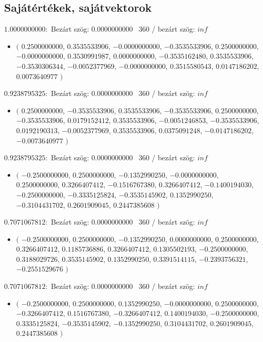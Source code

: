 \documentclass[14pt,a4paper]{article}
\begin{document}
\subsection{Sajátértékek, sajátvektorok}
$1.0000000000$:\
Bezárt szög: $0.0000000000$ \
360 / bezárt szög: $inf$\
\begin{itemize}
\item
$\big($
$0.2500000000$, $0.3535533906$, $-0.0000000000$, $-0.3535533906$, $0.2500000000$, $-0.0000000000$, $0.3530991987$, $0.0000000000$, $-0.3535162480$, $0.3535533906$, $-0.3530306344$, $-0.0052377969$, $-0.0000000000$, $0.3515580543$, $0.0147186202$, $0.0073640977$
$\big)$
\end{itemize}
$0.9238795325$:\
Bezárt szög: $0.0000000000$ \
360 / bezárt szög: $inf$\
\begin{itemize}
\item
$\big($
$0.2500000000$, $-0.3535533906$, $0.3535533906$, $-0.3535533906$, $0.2500000000$, $-0.3535533906$, $0.0179152412$, $0.3535533906$, $-0.0051246853$, $-0.3535533906$, $0.0192190313$, $-0.0052377969$, $0.3535533906$, $0.0375091248$, $-0.0147186202$, $-0.0073640977$
$\big)$
\end{itemize}
$0.9238795325$:\
Bezárt szög: $0.0000000000$ \
360 / bezárt szög: $inf$\
\begin{itemize}
\item
$\big($
$-0.2500000000$, $0.2500000000$, $-0.1352990250$, $-0.0000000000$, $0.2500000000$, $0.3266407412$, $-0.1516767380$, $0.3266407412$, $-0.1400194030$, $-0.2500000000$, $-0.3335125824$, $-0.3535145902$, $0.1352990250$, $-0.3104431702$, $0.2601909045$, $0.2447385608$
$\big)$
\end{itemize}
$0.7071067812$:\
Bezárt szög: $0.0000000000$ \
360 / bezárt szög: $inf$\
\begin{itemize}
\item
$\big($
$-0.2500000000$, $0.2500000000$, $-0.1352990250$, $0.0000000000$, $0.2500000000$, $0.3266407412$, $0.1185736886$, $0.3266407412$, $0.1305502193$, $-0.2500000000$, $0.3188029726$, $0.3535145902$, $0.1352990250$, $0.3391514115$, $-0.2393756321$, $-0.2551529676$
$\big)$
\end{itemize}
$0.7071067812$:\
Bezárt szög: $0.0000000000$ \
360 / bezárt szög: $inf$\
\begin{itemize}
\item
$\big($
$-0.2500000000$, $0.2500000000$, $0.1352990250$, $-0.0000000000$, $0.2500000000$, $-0.3266407412$, $0.1516767380$, $-0.3266407412$, $0.1400194030$, $-0.2500000000$, $0.3335125824$, $-0.3535145902$, $-0.1352990250$, $0.3104431702$, $0.2601909045$, $0.2447385608$
$\big)$
\end{itemize}
\end{document}
